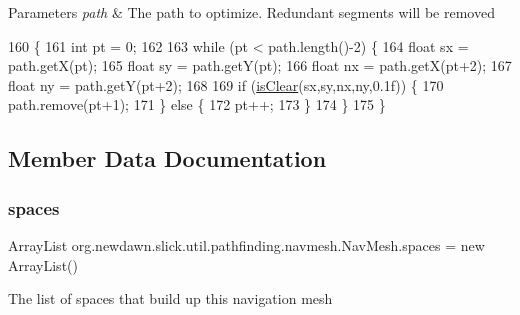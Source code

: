 \begin{DoxyParams}{Parameters}
{\em path} & The path to optimize. Redundant segments will be removed \\
\hline
\end{DoxyParams}

\begin{DoxyCode}
160                                         \{
161         \textcolor{keywordtype}{int} pt = 0;
162         
163         \textcolor{keywordflow}{while} (pt < path.length()-2) \{
164             \textcolor{keywordtype}{float} sx = path.getX(pt);
165             \textcolor{keywordtype}{float} sy = path.getY(pt);
166             \textcolor{keywordtype}{float} nx = path.getX(pt+2);
167             \textcolor{keywordtype}{float} ny = path.getY(pt+2);
168             
169             \textcolor{keywordflow}{if} (\mbox{\hyperlink{classorg_1_1newdawn_1_1slick_1_1util_1_1pathfinding_1_1navmesh_1_1_nav_mesh_ad40443ffa577a525bf4ac169f2c1d0de}{isClear}}(sx,sy,nx,ny,0.1f)) \{
170                 path.remove(pt+1);
171             \} \textcolor{keywordflow}{else} \{
172                 pt++;
173             \}
174         \}
175     \}
\end{DoxyCode}


\subsection{Member Data Documentation}
\mbox{\label{classorg_1_1newdawn_1_1slick_1_1util_1_1pathfinding_1_1navmesh_1_1_nav_mesh_a753a5f03305449a3c61d01a41c2fb129}} 
\subsubsection{\texorpdfstring{spaces}{spaces}}
{\footnotesize\ttfamily Array\+List org.\+newdawn.\+slick.\+util.\+pathfinding.\+navmesh.\+Nav\+Mesh.\+spaces = new Array\+List()\hspace{0.3cm}{\ttfamily [private]}}

The list of spaces that build up this navigation mesh 